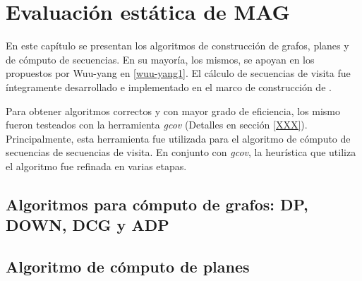 \chapter{Evaluación estática de MAG}
\label{chap:eval_est}
\minitoc

En este capítulo se presentan los algoritmos de construcción de grafos, planes y de cómputo de secuencias. En su mayoría, los mismos, se apoyan en los propuestos por Wuu-yang en \ref{wuu-yang1}. El cálculo de secuencias de visita fue íntegramente desarrollado e implementado en el marco de construcción de \maggen. 

Para obtener algoritmos correctos y con mayor grado de eficiencia, los mismo fueron testeados con la herramienta \textit{gcov} (Detalles en sección \ref{XXX}). Principalmente, esta herramienta fue utilizada para el algoritmo de cómputo de secuencias de secuencias de visita. En conjunto con \textit{gcov}, la heurística que utiliza el algoritmo fue refinada en varias etapas.

\section{Algoritmos para cómputo de grafos: DP, DOWN, DCG y ADP}







\section{Algoritmo de cómputo de planes}







